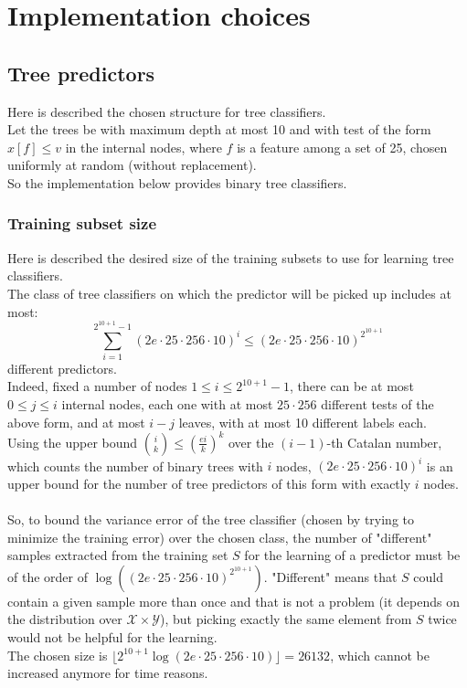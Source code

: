 \documentclass[12pt]{article}
\begin{document}
\section{Implementation choices}
\subsection{Tree predictors}
Here is described the chosen structure for tree classifiers.\\
Let the trees be with maximum depth at most 10 and with test of the form $x[f] \le v$ in the internal nodes, where $f$ is a feature among a set of 25, chosen uniformly at random (without replacement).\\
So the implementation below provides binary tree classifiers.
\subsubsection{Training subset size}
Here is described the desired size of the training subsets to use for learning tree classifiers.\\
The class of tree classifiers on which the predictor will be picked up includes at most:
$$\sum_{i = 1}^{2^{10 + 1} - 1}\left(2e \cdot 25 \cdot 256 \cdot 10\right)^{i} \le \left(2e \cdot 25 \cdot 256 \cdot 10\right)^{2^{10 + 1}}$$
different predictors.\\
Indeed, fixed a number of nodes $1 \le i \le 2^{10 + 1} - 1$, there can be at most $0 \le j \le i$ internal nodes, each one with at most $25\cdot256$ different tests of the above form, and at most $i - j$ leaves, with at most 10 different labels each.\\
Using the upper bound ${i \choose k} \le \left(\frac{ei}{k}\right)^k$ over the $(i-1)$-th Catalan number, which counts the number of binary trees with $i$ nodes, $\left(2e \cdot 25 \cdot 256 \cdot 10\right)^{i}$ is an\\ upper bound for the number of tree predictors of this form with exactly $i$ nodes.\\\\
So, to bound the variance error of the tree classifier (chosen by trying to minimize the training error) over the chosen class, the number of "different" samples extracted from the training set $S$ for the learning of a predictor must be of the order of $\log \left(\left(2e \cdot 25 \cdot 256 \cdot 10\right)^{2^{10 + 1}}\right)$. "Different" means that $S$ could contain a given sample more than once and that is not a problem (it depends on the distribution over $\mathcal{X} \times \mathcal{Y}$), but picking exactly the same element from $S$ twice would not be helpful for the learning.\\
The chosen size is $\lfloor 2^{10 + 1} \log \left(2e \cdot 25 \cdot 256 \cdot 10\right)\rfloor = 26132$, which cannot be\\ increased anymore for time reasons.
\end{document}
